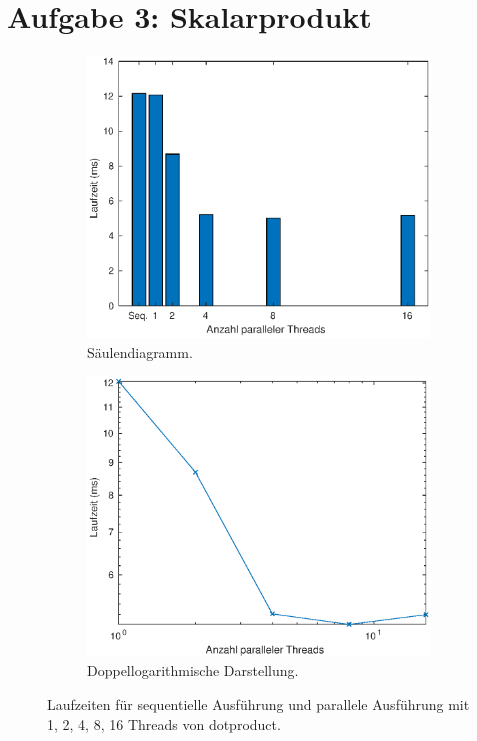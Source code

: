 \chapter{Aufgabe 3: Skalarprodukt}

\begin{figure}[tbp]
 \centering 
 \begin{subfigure}{.49\textwidth}
  \centering 
  \includegraphics[width=1\textwidth]{img/aufgabe3_barplot.eps}
  \caption{Säulendiagramm.}
  \label{fig:aufgabe3_barplot}
 \end{subfigure}
%
 \begin{subfigure}{.49\textwidth}
  \centering 
  \includegraphics[width=1\textwidth]{img/aufgabe3_logplot.eps}
  \caption{Doppellogarithmische Darstellung.}
  \label{fig:aufgabe3_logplot}
 \end{subfigure}
\caption{Laufzeiten für sequentielle Ausführung und parallele Ausführung mit 1, 2, 4, 8, 16 Threads von dotproduct.}
\label{fig:aufgabe3}
\end{figure}

